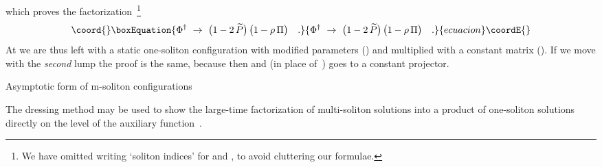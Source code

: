 \documentclass[a4paper,11pt]{article}
\makeatletter
\renewcommand{\section}{\@startsection{section}{1}{0pt}{\medskipamount}
{\medskipamount}{\large\bf}}
\numberwithin{equation}{section}
\def\b{\beta}
\providecommand{\Pt}{\widetilde{P}}
\makeatother
\begin{document}
which proves the factorization~\footnote{
We have omitted writing `soliton indices' for \myHighlight{$\Pt$}\coordHE{} and \myHighlight{$\Pi$}\coordHE{}, to avoid
cluttering our formulae.}
\begin{equation}\coord{}\boxEquation{ 
\Phi^{\dagger}\ \to\ \bigl(1-2\,\Pt\bigr)\,\bigl(1-\rho\,\Pi\bigr) \quad.
}{ 
\Phi^{\dagger}\ \to\ \bigl(1-2\,\Pt\bigr)\,\bigl(1-\rho\,\Pi\bigr) \quad.
}{ecuacion}\coordE{}\end{equation}
At \coordHE{} we are thus left with a static one-soliton configuration
with modified parameters (\coordHE{}) and multiplied with a constant matrix
(\coordHE{}).
If we move with the {\it second\/} lump the proof is the same, because then 
\myHighlight{$a\to\b_2 t$}\coordHE{} and \coordHE{} (in place of~\coordHE{}) goes to a constant projector.


\section{Asymptotic form of m-soliton configurations}

\noindent
The dressing method may be used to show the large-time factorization
of multi-soliton solutions into a product of one-soliton solutions
directly on the level of the auxiliary function~\coordHE{}.
\end{document}
